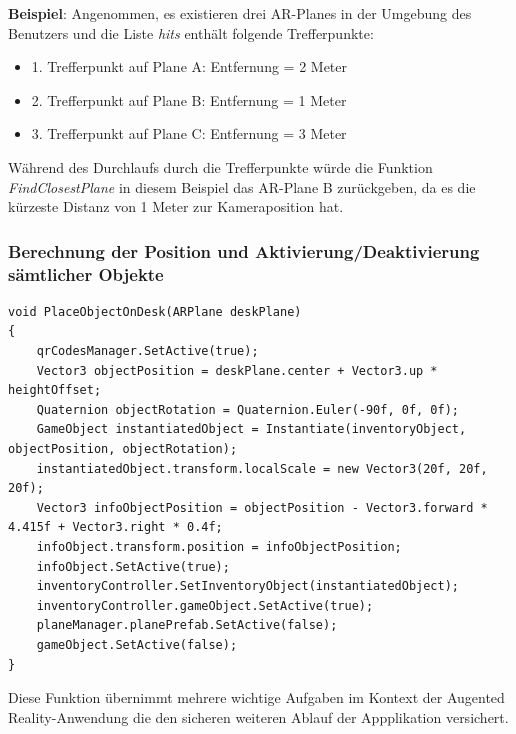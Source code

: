 \textbf{Beispiel}:
Angenommen, es existieren drei AR-Planes in der Umgebung des Benutzers und die Liste \textit{hits} enthält folgende
Trefferpunkte:
\begin{itemize}
    \item 1. Trefferpunkt auf Plane A: Entfernung = 2 Meter
    \item 2. Trefferpunkt auf Plane B: Entfernung = 1 Meter
    \item 3. Trefferpunkt auf Plane C: Entfernung = 3 Meter
\end{itemize}
Während des Durchlaufs durch die Trefferpunkte würde die Funktion \textit{FindClosestPlane} in diesem Beispiel das
AR-Plane B zurückgeben, da es die kürzeste Distanz von 1 Meter zur Kameraposition hat.\\

\subsubsection{Berechnung der Position und Aktivierung/Deaktivierung sämtlicher Objekte}
\begin{lstlisting}[style=csharp, caption={Inventar platzier - Funktion}, label=code:placeobject]
void PlaceObjectOnDesk(ARPlane deskPlane)
{
    qrCodesManager.SetActive(true);
    Vector3 objectPosition = deskPlane.center + Vector3.up * heightOffset;
    Quaternion objectRotation = Quaternion.Euler(-90f, 0f, 0f);
    GameObject instantiatedObject = Instantiate(inventoryObject, objectPosition, objectRotation);
    instantiatedObject.transform.localScale = new Vector3(20f, 20f, 20f);
    Vector3 infoObjectPosition = objectPosition - Vector3.forward * 4.415f + Vector3.right * 0.4f;
    infoObject.transform.position = infoObjectPosition;
    infoObject.SetActive(true);
    inventoryController.SetInventoryObject(instantiatedObject);
    inventoryController.gameObject.SetActive(true);
    planeManager.planePrefab.SetActive(false);
    gameObject.SetActive(false);
}
\end{lstlisting}
Diese Funktion übernimmt mehrere wichtige Aufgaben im Kontext der Augented Reality-Anwendung die den sicheren weiteren
Ablauf der Appplikation versichert.


